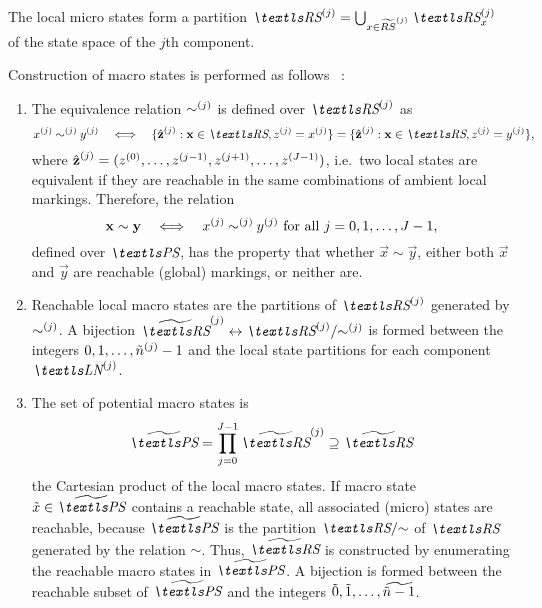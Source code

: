 The local micro states form a partition
$\loc{\RS}{j} = \bigcup_{x \in \loc{\Macro{RS}}{j}} \loc{\RS}{j}_{x}$
of the state space of the $j$th  component.

Construction of macro states is performed as follows%
~\citep{DBLP:journals/tse/Buchholz99}:
\begin{enumerate}
\item The equivalence relation $\sim^{(j)}$ is defined over
  $\loc{\RS}{j}$ as
  \begin{equation}
    \label{eq:genstor:explicit:block:locsim}
    \loc{x}{j} \mathbin{\loc{\sim}{j}} \loc{y}{j}
    \quad\Longleftrightarrow\quad \{ \loc{\hat{\vec{z}}}{j} : \vec{x}
    \in \RS, \loc{z}{j} =
    \loc{x}{j} \} = \{ \loc{\hat{\vec{z}}}{j} : \vec{x} \in \RS, \loc{z}{j} = \loc{y}{j} \}
    \text,
  \end{equation}
  where
  $\hat{\bm{\mathrm{z}}}^{(j)} = (z^{(0)}, \ldots, z^{(j - 1)},
  z^{(j + 1)}, \ldots, z^{(J - 1)})$,
  i.e.~two local states are equivalent if they are reachable in the
  same combinations of ambient local markings. Therefore, the relation
  \begin{equation}
    \bm{\mathrm{x}} \sim \bm{\mathrm{y}} \quad\Longleftrightarrow\quad x^{(j)}
    \mathbin{\sim^{(j)}} y^{(j)} \text{ for all $j = 0, 1,
      \ldots, J - 1$,}
  \end{equation}
  defined over $\PS$, has the property that whether
  $\vec{x} \sim \vec{y}$, either both $\vec{x}$ and $\vec{y}$ are
  reachable (global) markings, or neither are.
\item Reachable local macro states are the partitions of
  $\loc{\RS}{j}$ generated by $\sim^{(j)}$. A bijection
  $\loc{\Macro{\RS}}{j} \leftrightarrow \loc{\RS}{j} / {\loc{\sim}{j}}$
  is formed between the integers
  $0, 1, \ldots, \tilde{n}^{(j)} - 1$ and the local state
  partitions for each component $\LN{j}$.
\item The set of potential macro states is
  \begin{equation}
    \Macro{\PS} = \prod_{j = 0}^{J - 1} \loc{\Macro{\RS}}{j}
    \supseteq \Macro{\RS}
  \end{equation}
  the Cartesian product of the local macro states. If macro state
  $\macro{x} \in \Macro{\PS}$ contains a reachable state, all
  associated (micro) states are reachable, because $\Macro{\PS}$ is
  the partition $\RS / {\sim}$ of $\RS$ generated by the relation
  $\sim$. Thus, $\Macro{\RS}$ is constructed by enumerating the
  reachable macro states in $\Macro{\PS}$. A bijection is formed
  between the reachable subset of $\Macro{\PS}$ and the integers
  $\tilde{0}, \tilde{1}, \ldots, \widetilde{\tilde{n} - 1}$.
\end{enumerate}

